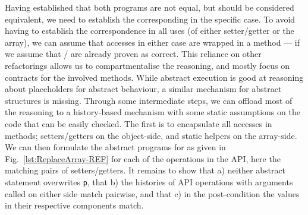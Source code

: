 Having established that both programs are not equal, but should be considered equivalent,
we need to establish the corresponding in the specific case.
To avoid having to establish the correspondence in all uses (of either setter/getter or the array),
we can assume that accesses in either case are wrapped in a method --- if we assume that / are already proven as correct.
This reliance on other refactorings allows us to compartmentalise the reasoning, and mostly focus on contracts for the involved methods.
While abstract execution is good at reasoning about placeholders for abstract behaviour, a similar mechanism for abstract structures is missing.
Through some intermediate steps, we can offload most of the reasoning to a history-based mechanism with some static assumptions on the code that can be easily checked.
The first is to encapsulate all accesses in methods; setters/getters on the object-side, and static helpers on the array-side.
We can then formulate the abstract programs for \Refinity{} as given in Fig.~\ref{lst:ReplaceArray-REF} for each of the operations in the API, here the matching pairs of setters/getters.
It remains to show that a) neither abstract statement overwrites \texttt{p}, that b) the histories of API operations with arguments called on either side match pairwise,
and that c) in the post-condition the values in their respective components match.





